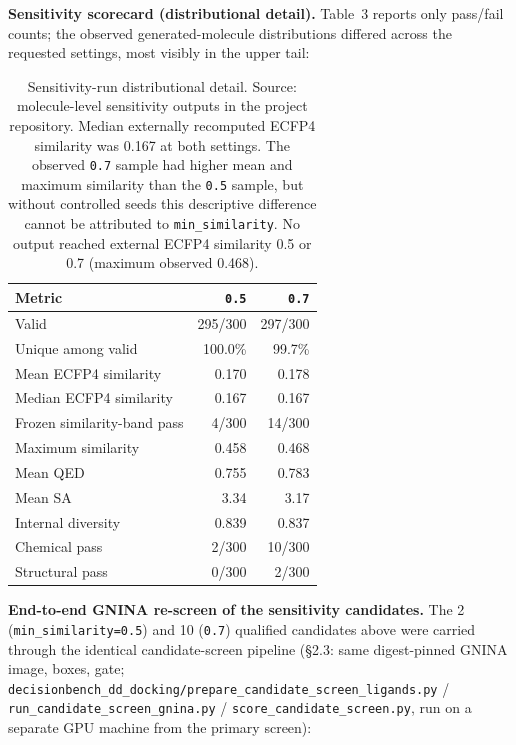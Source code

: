 \documentclass{article}
\begin{document}
\textbf{Sensitivity scorecard (distributional detail).} Table~3 reports only pass/fail counts; the observed generated-molecule distributions differed across the requested settings, most visibly in the upper tail:

\begin{table}[h]
\centering
\footnotesize
\begin{tabular}{lrr}
\toprule
Metric & \texttt{0.5} & \texttt{0.7} \\
\midrule
Valid & 295/300 & 297/300 \\
Unique among valid & 100.0\% & 99.7\% \\
Mean ECFP4 similarity & 0.170 & 0.178 \\
Median ECFP4 similarity & 0.167 & 0.167 \\
Frozen similarity-band pass & 4/300 & 14/300 \\
Maximum similarity & 0.458 & 0.468 \\
Mean QED & 0.755 & 0.783 \\
Mean SA & 3.34 & 3.17 \\
Internal diversity & 0.839 & 0.837 \\
Chemical pass & 2/300 & 10/300 \\
Structural pass & 0/300 & 2/300 \\
\bottomrule
\end{tabular}
\caption{Sensitivity-run distributional detail. Source: molecule-level sensitivity outputs in the project repository. Median externally recomputed ECFP4 similarity was 0.167 at both settings. The observed \texttt{0.7} sample had higher mean and maximum similarity than the \texttt{0.5} sample, but without controlled seeds this descriptive difference cannot be attributed to \texttt{min\_similarity}. No output reached external ECFP4 similarity 0.5 or 0.7 (maximum observed 0.468).}
\end{table}

\FloatBarrier

\textbf{End-to-end GNINA re-screen of the sensitivity candidates.} The 2 (\texttt{min\_similarity=0.5}) and 10 (\texttt{0.7}) qualified candidates above were carried through the identical candidate-screen pipeline (\S2.3: same digest-pinned GNINA image, boxes, gate; \texttt{decisionbench\_dd\_docking/prepare\_candidate\_screen\_ligands.py} / \texttt{run\_candidate\_screen\_gnina.py} / \texttt{score\_candidate\_screen.py}, run on a separate GPU machine from the primary screen):
\end{document}
